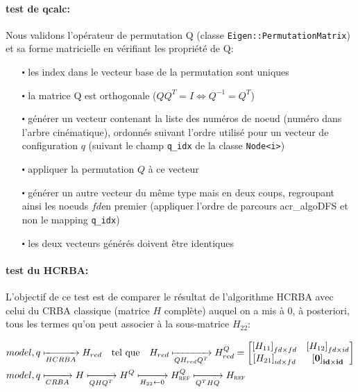 \documentclass{report}
\begin{document}
\paragraph{test de qcalc:}
Nous validons l'opérateur de permutation Q (classe \verb;Eigen::PermutationMatrix;) et sa forme matricielle en vérifiant les propriété de Q:
\begin{itemize}
\item[$\centerdot$] les index dans le vecteur base de la permutation sont uniques
\item[$\centerdot$] la matrice Q est orthogonale ($Q Q^T = I \iff Q^{-1} = Q^T$)
\item[$\centerdot$] générer un vecteur contenant la liste des numéros de noeud (numéro dans l'arbre cinématique), ordonnés suivant l'ordre utilisé pour un vecteur de configuration $q$ (suivant le champ \verb;q_idx; de la classe \verb;Node<i>;)
\item[$\centerdot$] appliquer la permutation $Q$ à ce vecteur
\item[$\centerdot$] générer un autre vecteur du même type mais en deux coups, regroupant ainsi les noeuds $fd$en premier (appliquer l'ordre de parcours \gls{acr_algoDFS} et non le mapping \verb;q_idx;)
\item[$\centerdot$] les deux vecteurs générés doivent être identiques
\end{itemize}


\paragraph{test du HCRBA:}
L'objectif de ce test est de comparer le résultat de l'algorithme HCRBA avec celui du CRBA classique (matrice $H$ complète) auquel on a mis à 0, à posteriori, tous les termes qu'on peut associer à la sous-matrice $H_{22}$:\vspace{-1cm}
\begin{spacing}{1.5}
\begin{align*}
&model,q \xmapsto[HCRBA]{} 
H_{red} \quad \textnormal{tel que} \quad H_{red} \xmapsto[Q H_{red} Q^T]{} 
H_{red}^Q = 
\begin{bmatrix}
  \left[H_{11}\right]_{fd \times fd} & \left[H_{12}\right]_{fd \times id} \\
  \left[H_{21}\right]_{id \times fd} & \mathbf{\left[0\right]_{id \times id}} \\
\end{bmatrix} \\
&model,q \xmapsto[CRBA]{} H \xmapsto[Q H Q^T]{} H^Q \xmapsto[H_{22} \leftarrow 0]{} H_{\textsc{ref}}^Q \xmapsto[Q^T H Q]{} H_{\textsc{ref}}
\end{align*}
\end{spacing}
\end{document}
